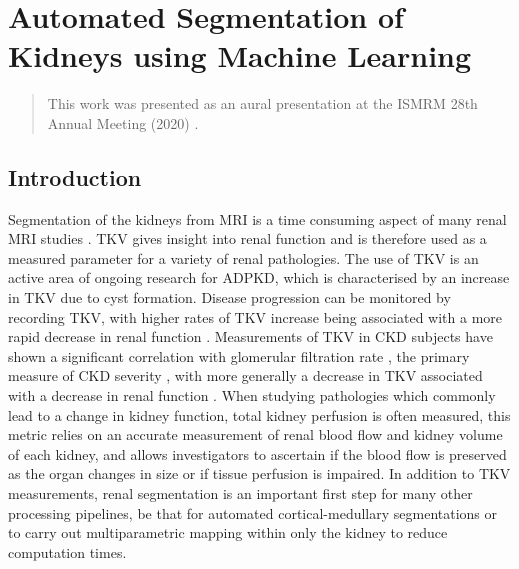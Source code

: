 \chapter{Automated Segmentation of Kidneys using Machine Learning}
\label{chap:ML}

\begin{abstract}
	
	
	This work was presented as an aural presentation at the \ac{ISMRM} 28th Annual Meeting (2020) \cite{daniel_automated_2020}.
	
	\lipsum[1]
\end{abstract}
\newpage

\section{Introduction}

Segmentation of the kidneys from \ac{MRI} is a time consuming aspect of many renal \ac{MRI} studies \cite{cox_multiparametric_2017, cohen_mri_2009, van_den_dool_functional_2005}. \ac{TKV} gives insight into renal function and is therefore used as a measured parameter for a variety of renal pathologies. The use of \ac{TKV} is an active area of ongoing research for \ac{ADPKD}, which is characterised by an increase in \ac{TKV} due to cyst formation. Disease progression can be monitored by recording \ac{TKV}, with higher rates of \ac{TKV} increase being associated with a more rapid decrease in renal function \cite{chapman_kidney_2012, tangri_total_2017, grantham_volume_2006}. Measurements of \ac{TKV} in \ac{CKD} subjects have shown a significant correlation with glomerular filtration rate \cite{buchanan_quantitative_2019}, the primary measure of \ac{CKD} severity \cite{stevens_assessing_2006}, with more generally a decrease in \ac{TKV} associated with a decrease in renal function \cite{gong_relationship_2012}. When studying pathologies which commonly lead to a change in kidney function, total kidney perfusion is often measured, this metric relies on an accurate measurement of renal blood flow and kidney volume of each kidney, and allows investigators to ascertain if the blood flow is preserved as the organ changes in size or if tissue perfusion is impaired. In addition to \ac{TKV} measurements, renal segmentation is an important first step for many other processing pipelines, be that for automated cortical-medullary segmentations or to carry out multiparametric mapping within only the kidney to reduce computation times. 

